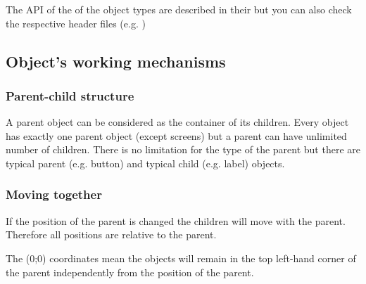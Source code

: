\documentclass[letterpaper,10pt,english]{sphinxmanual}
\begin{document}
The API of the of the object types are described in their {\hyperref[\detokenize{object-types/index::doc}]{}} but you can also check the respective header files (e.g. )


\subsection{Object’s working mechanisms}
\label{\detokenize{overview/objects:object-s-working-mechanisms}}

\subsubsection{Parent-child structure}
\label{\detokenize{overview/objects:parent-child-structure}}
A parent object can be considered as the container of its children. Every object has exactly one parent object (except screens) but a parent can have unlimited number of children.
There is no limitation for the type of the parent but there are typical parent (e.g. button) and typical child (e.g. label) objects.


\subsubsection{Moving together}
\label{\detokenize{overview/objects:moving-together}}
If the position of the parent is changed the children will move with the parent.
Therefore all positions are relative to the parent.

The (0;0) coordinates mean the objects will remain in the top left-hand corner of the parent independently from the position of the parent.


\begin{sphinxVerbatim}[commandchars=\\\{\}]
      
  	                   

     	         
  	                   
\end{sphinxVerbatim}
\end{document}
